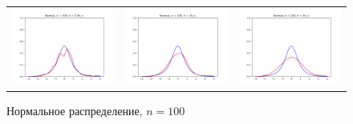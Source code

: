 	\begin{figure}[H]
		\centering
		\begin{tabular}{ccc}
			\includegraphics[width=55mm, height =0.25\textheight]{pics/ker_n_100_1.png}
			&
			\includegraphics[width=55mm, height =0.25\textheight]{pics/ker_n_100_2.png}
			&
			\includegraphics[width=55mm, height =0.25\textheight]{pics/ker_n_100_3.png}
		\end{tabular}
		\caption{Нормальное распределение, $n = 100$}
		\label{fig:normal}
	\end{figure}
	
